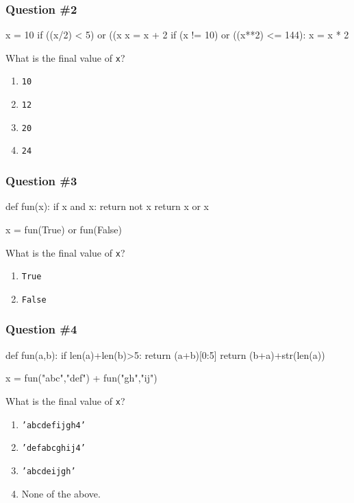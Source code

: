 \documentclass[11pt]{beamer}
\begin{document}
\begin{frame}[fragile]
  \frametitle{Question \#2}
  \Enlarge

  \begin{semiverbatim}
x = 10
if ((x/2) < 5) or ((x%
    x = x + 2
if (x != 10) or ((x**2) <= 144):
    x = x * 2
  \end{semiverbatim}
  What is the final value of \texttt{x}?
  \begin{enumerate}[label=\Alph*]
  \item  \texttt{10}
  \item  \texttt{12}
  \item  \texttt{20}
  \item  \texttt{24}
  \end{enumerate}
\end{frame}

\begin{frame}[fragile]
  \frametitle{Question \#3}
  \Enlarge

  \begin{semiverbatim}
def fun(x):
    if x and x:
        return not x
    return x or x

x = fun(True) or fun(False)
  \end{semiverbatim}
  What is the final value of \texttt{x}?
  \begin{enumerate}[label=\Alph*]
  \item  \texttt{True}
  \item  \texttt{False}
  \end{enumerate}
\end{frame}

\begin{frame}[fragile]
  \frametitle{Question \#4}
  \Enlarge

  \begin{semiverbatim}
def fun(a,b):
    if len(a)+len(b)>5:
        return (a+b)[0:5]
  return (b+a)+str(len(a))

x = fun("abc","def") + fun("gh","ij")
  \end{semiverbatim}
  What is the final value of \texttt{x}?
  \begin{enumerate}[label=\Alph*]
  \item  \texttt{'abcdefijgh4'}
  \item  \texttt{'defabcghij4'}
  \item  \texttt{'abcdeijgh'}
  \item  None of the above.
  \end{enumerate}
\end{frame}
\end{document}
